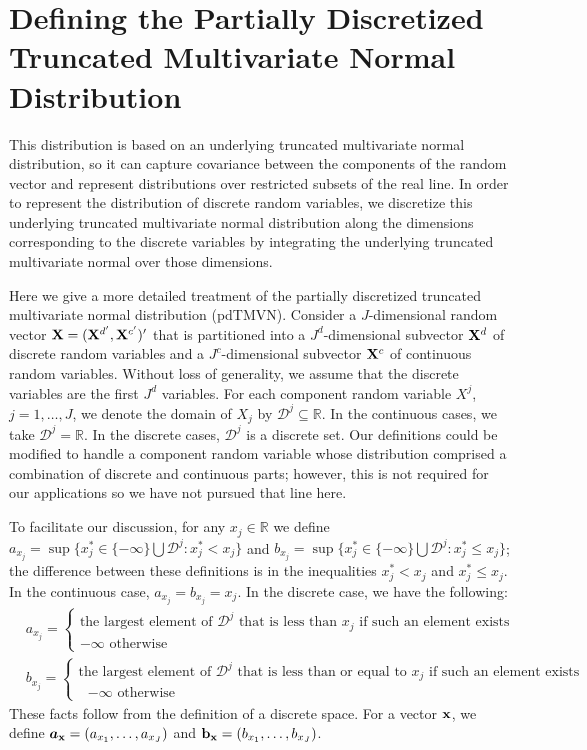 \documentclass[fleqn]{article}
\begin{document}
\section{Defining the Partially Discretized Truncated Multivariate Normal Distribution}
\label{sec:definition}

This distribution is based on an underlying truncated multivariate normal distribution, so it can capture covariance between the components of the random vector and represent distributions over restricted subsets of the real line.  In order to represent the distribution of discrete random variables, we discretize this underlying truncated multivariate normal distribution along the dimensions corresponding to the discrete variables by integrating the underlying truncated multivariate normal over those dimensions.

Here we give a more detailed treatment of the partially discretized truncated multivariate normal distribution (pdTMVN).  Consider a $J$-dimensional random vector ${\bf X} = ({\bf X}^{d'}, {\bf X}^{c'})'$ that is partitioned into a $J^d$-dimensional subvector ${\bf X}^d$ of discrete random variables and a $J^c$-dimensional subvector ${\bf X}^c$ of continuous random variables.  Without loss of generality, we assume that the discrete variables are the first $J^d$ variables.  For each component random variable $X^j$, $j = 1, \ldots, J$, we denote the domain of $X_j$ by $\mathcal{D}^j \subseteq \mathbb{R}$.  In the continuous cases, we take $\mathcal{D}^j = \mathbb{R}$.  In the discrete cases, $\mathcal{D}^j$ is a discrete set.  Our definitions could be modified to handle a component random variable whose distribution comprised a combination of discrete and continuous parts; however, this is not required for our applications so we have not pursued that line here.

To facilitate our discussion, for any $x_j \in \mathbb{R}$ we define $a_{x_j} = \sup \{x_j^* \in \{ - \infty \} \bigcup \mathcal{D}^j: x_j^* < x_j \}$ and $b_{x_j} = \sup \{x_j^* \in \{ - \infty \} \bigcup \mathcal{D}^j: x_j^* \leq x_j \}$; the difference between these definitions is in the inequalities $x_j^* < x_j$ and $x_j^* \leq x_j$.  In the continuous case, $a_{x_j} = b_{x_j} = x_j$.  In the discrete case, we have the following:
\begin{align}
&a_{x_j} = \begin{cases} \text{the largest element of $\mathcal{D}^j$ that is less than $x_j$ if such an element exists} \\
\text{$- \infty$ otherwise}
\end{cases} \\
&b_{x_j} = \begin{cases} \text{the largest element of $\mathcal{D}^j$ that is less than or equal to $x_j$ if such an element exists} \\
\text{ $- \infty$ otherwise}
\end{cases}
\end{align}
These facts follow from the definition of a discrete space.  For a vector ${\bf x}$, we define ${\mbox{\boldmath$a$}}_{\bf x} = (a_{x_1}, \ldots, a_{x_J})$ and ${\bf b}_{\bf x} = (b_{x_1}, \ldots, b_{x_J})$.
\end{document}
